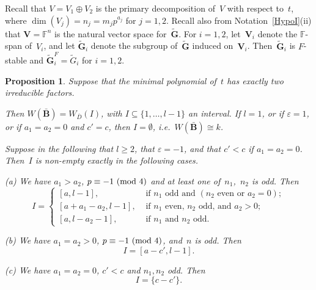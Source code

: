 \documentclass[12pt]{amsart}
\newcommand{\bG}{{\mathbf{G}}}      %
\newcommand{\bB}{{\mathbf{B}}}
\newcommand{\bV}{{\mathbf{V}}}
\newtheorem{prop}[thm]{Proposition}
\theoremstyle{theorem}
\theoremstyle{definition}
\theoremstyle{remark}
\begin{document}
Recall that $V = V_1 \oplus V_2$ is the primary decomposition of~$V$ with 
respect to~$t$, where $\dim(V_j) = n_j = m_jp^{a_j}$ for $j = 1, 2$. Recall also 
from 
Notation~\ref{HypoI}(ii) that $\bV = \mathbb{F}^n$ is the natural vector space 
for~$\tilde{\bG}$. For $i = 1, 2$, let~$\bV_i$ denote the $\mathbb{F}$-span 
of~$V_i$, and let $\tilde{\bG}_i$ denote the subgroup of~$\tilde{\bG}$ induced
on~$\bV_i$. Then~$\tilde{\bG}_i$ is $F$-stable and
$\tilde{\bG}_i^F = \tilde{G}_i$ for $i = 1, 2$.

\addtocounter{thm}{1}
\begin{prop}
\label{MainCorCase2}
Suppose that the minimal polynomial of~$t$ has exactly two irreducible factors. 

Then $W( \bar{\bB} ) = W_{\bar{D}}( I )$, with 
$I \subseteq \{ 1, \ldots, l - 1 \}$ an interval. 
If $l = 1$, or if $\varepsilon = 1$, or if $a_1 = a_2 = 0$ 
and $c' = c$, then $I = \emptyset$, i.e.\ $W( \bar{\bB} ) \cong k$. 

Suppose in the following that $l \geq 2$, that $\varepsilon = -1$, and that 
$c' < c$ if $a_1 = a_2 = 0$. Then~$I$ is non-empty exactly in the following 
cases.

{\rm (a)} We have $a_1 > a_2$, $p \equiv -1\,\,(\mbox{\rm mod}\,\,4)$ and at 
least one of~$n_1$,~$n_2$ is odd. Then
$$I = 
\begin{cases} 
[a, l - 1], & \text{\ if\ } n_1 \text{\ odd and\ } (n_2 \text{\ even or\ } a_2 = 0); \\
[a + a_1 - a_2, l - 1], & \text{\ if\ } n_1 \text{\ even,\ } n_2 \text{\ odd, and\ } a_2 > 0; \\
[a, l - a_2 - 1], & \text{\ if\ } n_1 \text{\ and\ } n_2 \text{\ odd}.
\end{cases}
$$

{\rm (b)} We have $a_1 = a_2 > 0$, $p \equiv -1\,\,(\mbox{\rm mod}\,\,4)$, and~$n$ 
is odd. Then
$$I = [a - c', l - 1].
$$

{\rm (c)} We have $a_1 = a_2 = 0$, $c' < c$ and $n_1, n_2$ odd. Then
$$I = \{ c - c' \}.$$
\end{prop}
\end{document}

